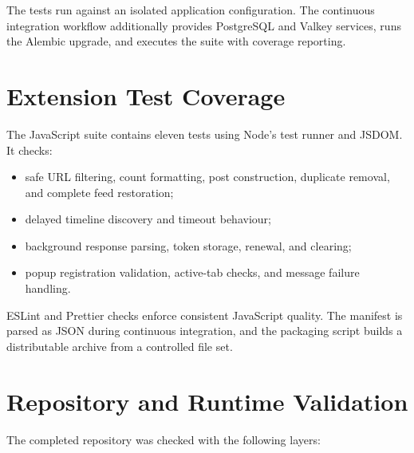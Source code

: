 \documentclass[11pt,a4paper]{report}
\begin{document}
The tests run against an isolated application configuration. The continuous
integration workflow additionally provides PostgreSQL and Valkey services,
runs the Alembic upgrade, and executes the suite with coverage reporting.

\section{Extension Test Coverage}
The JavaScript suite contains eleven tests using Node's test runner and JSDOM.
It checks:

\begin{itemize}
  \item safe URL filtering, count formatting, post construction, duplicate
  removal, and complete feed restoration;
  \item delayed timeline discovery and timeout behaviour;
  \item background response parsing, token storage, renewal, and clearing;
  \item popup registration validation, active-tab checks, and message failure
  handling.
\end{itemize}

ESLint and Prettier checks enforce consistent JavaScript quality. The manifest
is parsed as JSON during continuous integration, and the packaging script
builds a distributable archive from a controlled file set.

\section{Repository and Runtime Validation}
The completed repository was checked with the following layers:
\end{document}
